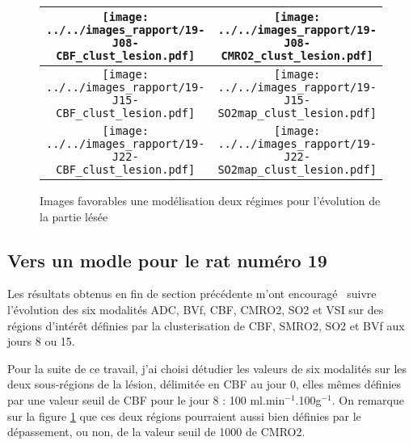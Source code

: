 \begin{figure}[!p]
\begin{center}
\begin{tabular}{|c|c|}
\hline
\texttt{[image: ../../images\_rapport/19-J08-CBF\_clust\_lesion.pdf]}
&
\texttt{[image: ../../images\_rapport/19-J08-CMRO2\_clust\_lesion.pdf]}
\\
\hline
\texttt{[image: ../../images\_rapport/19-J15-CBF\_clust\_lesion.pdf]}
&
\texttt{[image: ../../images\_rapport/19-J15-SO2map\_clust\_lesion.pdf]}
\\
\hline
\texttt{[image: ../../images\_rapport/19-J22-CBF\_clust\_lesion.pdf]}
&
\texttt{[image: ../../images\_rapport/19-J22-SO2map\_clust\_lesion.pdf]}
\\
\hline
\end{tabular}
\end{center}
\caption{Images favorables  une mod\'elisation  deux r\'egimes pour l'\'evolution de la partie l\'es\'ee}
\label{19_reg_clust_les}
\end{figure}


\FloatBarrier
\subsection{Vers un modle pour le rat num\'ero 19}

Les r\'esultats obtenus en fin de section pr\'ec\'edente m'ont encourag\'e  suivre l'\'evolution des six modalit\'es %
ADC, BVf, CBF, CMRO2, SO2 et VSI sur des r\'egions d'int\'er\^et d\'efinies par la clusterisation de CBF, SMRO2, SO2 et BVf aux jours 8 ou 15.

%
%
%

\ligneinter
Pour la suite de ce travail, j'ai choisi d\'etudier les valeurs de six modalit\'es sur les deux sous-r\'egions de la l\'esion, d\'elimit\'ee en CBF au jour 0, %
elles m\^emes d\'efinies par une valeur seuil de CBF pour le jour 8 : 100 ml.min${}^{-1}$.100g${}^{-1}$. %
On remarque sur la figure \ref{19_reg_clust_les} que ces deux r\'egions pourraient aussi bien d\'efinies par le d\'epassement, ou non, de la valeur seuil de 1000 %
de CMRO2.

